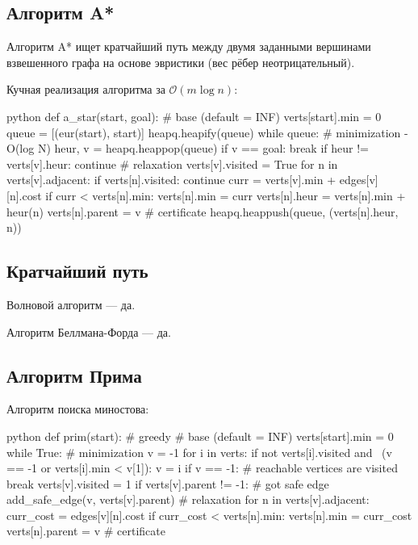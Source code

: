 \subsection{Алгоритм A*}

{\bold Алгоритм A*} ищет кратчайший путь между двумя заданными вершинами взвешенного графа на основе {\ital эвристики} {\ital\color{desc} (вес рёбер неотрицательный)}.

{\bold Кучная} реализация алгоритма за $\mathcal{O}(m\log n)$:

\begin{code}{python}
def a_star(start, goal):
  # base (default = INF)
  verts[start].min = 0
  queue = [(eur(start), start)]
  heapq.heapify(queue)
  while queue:
    # minimization - O(log N)
    heur, v = heapq.heappop(queue)
    if v == goal:
      break
    if heur != verts[v].heur:
      continue
    # relaxation
    verts[v].visited = True
    for n in verts[v].adjacent:
      if verts[n].visited:
        continue
      curr = verts[v].min + edges[v][n].cost
      if curr < verts[n].min:
         verts[n].min = curr
         verts[n].heur = verts[n].min + heur(n)
         verts[n].parent = v # certificate
         heapq.heappush(queue, (verts[n].heur, n))
\end{code}

\subsection{Кратчайший путь}

{\bold Волновой алгоритм} --- да.

{\bold Алгоритм Беллмана-Форда} --- да.

\subsection{Алгоритм Прима}

{\bold Алгоритм} поиска {\ital миностова}:

\begin{code}{python}
def prim(start): # greedy
  # base (default = INF)
  verts[start].min = 0
  while True:
    # minimization
    v = -1
    for i in verts:
      if not verts[i].visited and \
         (v == -1 or verts[i].min < v[1]):
           v = i
    if v == -1: # reachable vertices are visited
      break
    verts[v].visited = 1
    if verts[v].parent != -1: # got safe edge
      add_safe_edge(v, verts[v].parent)
    # relaxation
    for n in verts[v].adjacent:
      curr_cost = edges[v][n].cost
      if curr_cost < verts[n].min:
        verts[n].min = curr_cost
        verts[n].parent = v # certificate
\end{code}

